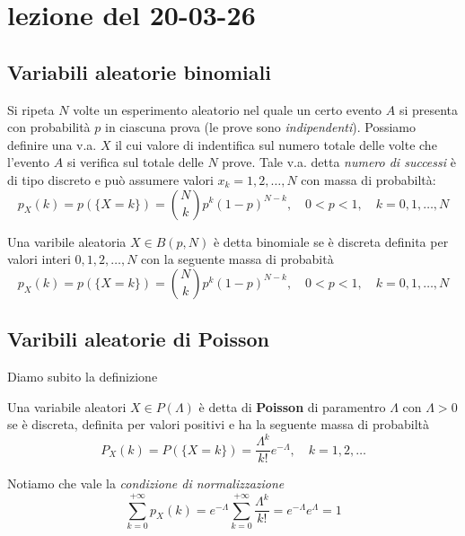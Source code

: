 \section{lezione del 20-03-26}
\subsection{Variabili aleatorie binomiali}\label{sub:Variabili aleatorie binomiali} %
Si ripeta $N$ volte un esperimento aleatorio nel quale un certo evento $A$ si presenta
con probabilità $p$ in ciascuna prova (le prove sono \textit{indipendenti}).
Possiamo definire una v.a. $X$ il cui valore di indentifica sul numero totale delle volte
che l'evento $A$ si verifica sul totale delle $N$ prove. Tale v.a. detta \textit{numero di successi} è di 
tipo discreto e può assumere valori $x_k = 1,2, \dots, N$ con massa di probabiltà:
\[
    p_X(k) = p(\{X = k\}) = \binom{N}{k}p^k(1 - p)^{N-k}, \quad 0 < p < 1,\quad k = 0, 1, \dots, N
\]
\begin{definition}\label{variabile aleatorio binomiale}
    Una varibile aleatoria $X \in B(p, N)$ è detta binomiale se è discreta 
    definita per valori interi $0, 1, 2, \dots, N$  con la seguente massa di probabità
    \begin{displaymath}
                p_X(k) = p(\{X = k\}) = \binom{N}{k}p^k(1 - p)^{N-k}, \quad 0 < p < 1,\quad k = 0, 1, \dots, N 
    \end{displaymath}
\end{definition}
\subsection{Varibili aleatorie di Poisson}\label{sub:Varibili aleatorie di Poisson} %
Diamo subito la definizione
\begin{definition}\label{variabile aleatorio di Poisson}
    Una variabile aleatori $X \in P(\Lambda)$ è detta di \textbf{Poisson} di paramentro $\Lambda$ con $\Lambda > 0$ 
    se è discreta, definita per valori positivi e ha la seguente massa di probabiltà
    \begin{displaymath}
        P_X(k) =P(\{X = k\}) = \frac{\Lambda^k}{k!}e^{-\Lambda}, \quad k = 1, 2, \dots 
    \end{displaymath}
\end{definition}
Notiamo che vale la \textit{condizione di normalizzazione}
\[
    \sum_{k = 0}^{+\infty}p_X(k) = e^{-\Lambda} \sum_{k = 0}^{+\infty}\frac{\Lambda^k}{k!} = e^{-\Lambda}e^{\Lambda} = 1
\]
